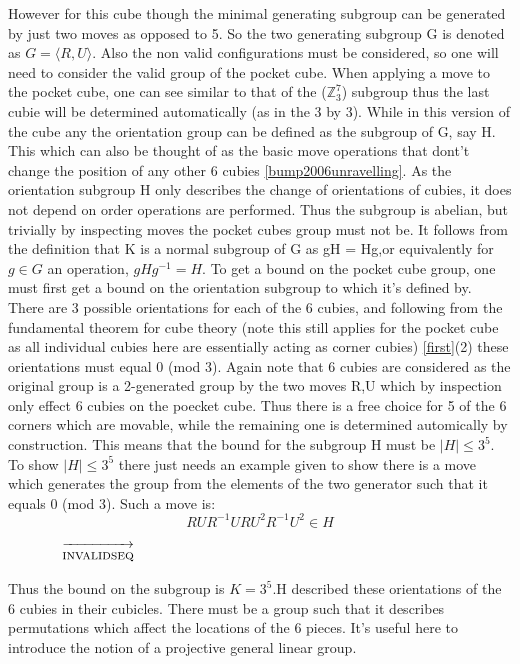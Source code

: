 \documentclass{article}
\begin{document}
However for this cube though the minimal generating subgroup can be generated by just two moves as opposed to 5. So the two generating subgroup G is denoted as $G = \langle R, U\rangle$. Also the non valid configurations must be considered, so one will need to consider the valid group of the pocket cube. When applying a move to the pocket cube, one can see similar to that of the ($\mathbb{Z}_{3}^{7}$) subgroup thus the last cubie will be determined automatically (as in the 3 by 3). While in this version of the cube any the orientation group can be defined as the subgroup of G, say H. This which can also be thought of as the basic move operations that dont't change the position of any other 6 cubies \ref{bump2006unravelling}. As the orientation subgroup H only describes the change of orientations of cubies, it does not depend on order operations are performed. Thus the subgroup is abelian, but trivially by inspecting moves the pocket cubes group must not be. It follows from the definition that K is a normal subgroup of G as gH = Hg,or equivalently for $g \in G$ an operation, $gHg^{-1} = H$. To get a bound on the pocket cube group, one must first get a bound on the orientation subgroup to which it's defined by. There are 3 possible orientations for each of the 6 cubies, and following from  the fundamental theorem for cube theory (note this still applies for the pocket cube as all individual cubies here are essentially acting as corner cubies) \ref{first}(2) these orientations must equal 0 (mod 3). Again note that 6 cubies are considered as the original group is a 2-generated group by the two moves R,U which by inspection only effect 6 cubies on the poecket cube. Thus there is a free choice for 5 of the 6 corners which are movable, while the remaining one is determined automically by construction. This means that the bound for the subgroup H must be $|H| \leq 3^5$. To show $|H| \leq 3^5$ there just needs an example given to show there is a move which generates the group from the elements of the two generator such that it equals 0 (mod 3). Such a move is:
\begin{equation}
RUR^{-1}URU^{2}R^{-1}U^{2} \in H
\end{equation}

\newcommand{\changecorner}{[Orient 3 Corner],R,U,Rp,U,R,U2,Rp,U2}%
\newcommand{\changecornerarrow}{$\quad\overrightarrow{\strut\textsc{invalidseq}}\quad$}

\begin{figure}[h]
\centering
  \TwoCubeSolved%
  \changecornerarrow
  \TwoRotation{\changecorner}
\end{figure}
Thus the bound on the subgroup is $K = 3^5$.\newline H described these orientations of the 6 cubies in their cubicles. There must be a group such that it describes permutations which affect the locations of the 6 pieces.
It's useful here to introduce the notion of a projective general linear group. 
\end{document}

